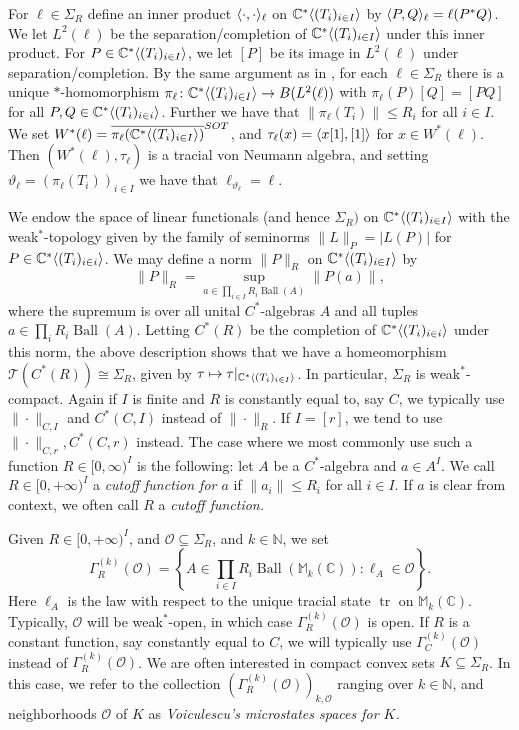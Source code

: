 \documentclass[10pt]{amsart}
\theoremstyle{definition}
\numberwithin{equation}{section}
\newcommand{\bC}{{\mathbb C}}
\newcommand{\bM}{{\mathbb M}}
\newcommand{\bN}{{\mathbb N}}
\newcommand{\cT}{{\mathcal T}}
\DeclareMathOperator{\tr}{tr}
\DeclareMathOperator{\Ball}{Ball}
\DeclarePairedDelimiter{\ip}{\langle}{\rangle}
\begin{document}
For $\ell\in\Sigma_{R}$ define an inner product $\ip{\cdot,\cdot}_{\ell}$ on $\bC^{*}\ip{(T_{i})_{i\in I}}$ by $\ip{P,Q}_{\ell}=\ell(P^{*}Q)$. We let $L^{2}(\ell)$ be the separation/completion of $\bC^{*}\ip{(T_{i})_{i\in I}}$ under this inner product. For $P\in \bC^{*}\ip{(T_{i})_{i\in I}}$, we let $[P]$ be its image in $L^{2}(\ell)$ under separation/completion. By the same argument as in \cite[Proposition 4.2]{BNLaws}, for each $\ell\in\Sigma_{R}$ there is a unique $*$-homomorphism $\pi_{\ell}\colon \bC^{*}\ip{(T_{i})_{i\in I}}\to B(L^{2}(\ell))$ with $\pi_{\ell}(P)[Q]=[PQ]$ for all $P,Q\in \bC^{*}\ip{(T_{i})_{i\in i}}$. Further we have that $\|\pi_{\ell}(T_{i})\|\leq R_{i}$ for all $i\in I$. We set $W^{*}(\ell)=\overline{\pi_{\ell}(\bC^{*}\ip{(T_{i})_{i\in I}})}^{SOT}$, and $\tau_{\ell}(x)=\ip{x[1],[1]}$ for $x\in W^{*}(\ell)$. Then $(W^{*}(\ell),\tau_{\ell})$ is a tracial von Neumann algebra, and setting $\vartheta_{\ell}=(\pi_{\ell}(T_{i}))_{i\in I}$ we have that $\ell_{\vartheta_{\ell}}=\ell$. 



We endow the space of linear functionals (and hence $\Sigma_{R})$ on $\bC^{*}\ip{(T_{i})_{i\in I}}$ with the weak$^{*}$-topology given by the family of seminorms $\|L\|_{P}=|L(P)|$ for $P\in \bC^{*}\ip{(T_{i})_{i\in i}}$.
We may define a norm $\|P\|_{R}$ on $\bC^{*}\ip{(T_{i})_{i\in I}}$ by 
\[\|P\|_{R}=\sup_{a\in \prod_{i\in I}R_{i}\Ball(A)}\|P(a)\|,\]
where the supremum is over all unital $C^{*}$-algebras $A$ and all tuples $a\in \prod_{i}R_{i}\Ball(A)$. Letting $C^{*}(R)$ be the completion of $\bC^{*}\ip{(T_{i})_{i\in i}}$ under this norm, the above description shows that we have a homeomorphism $\cT(C^{*}(R))\cong \Sigma_{R}$, given by $\tau\mapsto \tau|_{\bC^{*}\ip{(T_{i})_{i\in I}}}$. In particular, $\Sigma_{R}$ is weak$^{*}$-compact. Again if $I$ is finite and $R$ is constantly equal to, say $C$, we typically use $\|\cdot\|_{C,I}$ and $C^{*}(C,I)$ instead of $\|\cdot\|_{R}$. If $I=[r]$, we tend to use $\|\cdot\|_{C,r},C^{*}(C,r)$ instead.
The case where we most commonly use such a function $R\in [0,\infty)^{I}$ is the following: let $A$ be a $C^{*}$-algebra and $a\in A^{I}$. We call $R\in [0,+\infty)^{I}$ a \emph{cutoff function for $a$} if $\|a_{i}\|\leq R_{i}$ for all $i\in I$. If $a$ is clear from context, we often call $R$ a \emph{cutoff function.}


Given $R\in [0,+\infty)^{I}$, and $\mathcal{O}\subseteq \Sigma_{R}$, and $k\in \bN$, we set
\[\Gamma_{R}^{(k)}(\mathcal{O})=\left\{A\in \prod_{i\in I}R_{i}\Ball(\bM_{k}(\bC)):\ell_{A}\in \mathcal{O}\right\}.\]
Here $\ell_{A}$ is the law with respect to the unique tracial state $\tr$ on $\bM_{k}(\bC)$. Typically, $\mathcal{O}$ will be weak$^{*}$-open, in which case $\Gamma^{(k)}_{R}(\mathcal{O})$ is open. If $R$ is a constant function, say constantly equal to $C$, we will typically use $\Gamma_{C}^{(k)}(\mathcal{O})$ instead of $\Gamma^{(k)}_{R}(\mathcal{O})$. We are often interested in compact convex sets $K\subseteq \Sigma_{R}$. In this case, we refer to the collection $(\Gamma^{(k)}_{R}(\mathcal{O}))_{k,\mathcal{O}}$ ranging over $k\in \bN$, and neighborhoods $\mathcal{O}$ of $K$ as \emph{Voiculescu's microstates spaces for $K$.}
\end{document}
